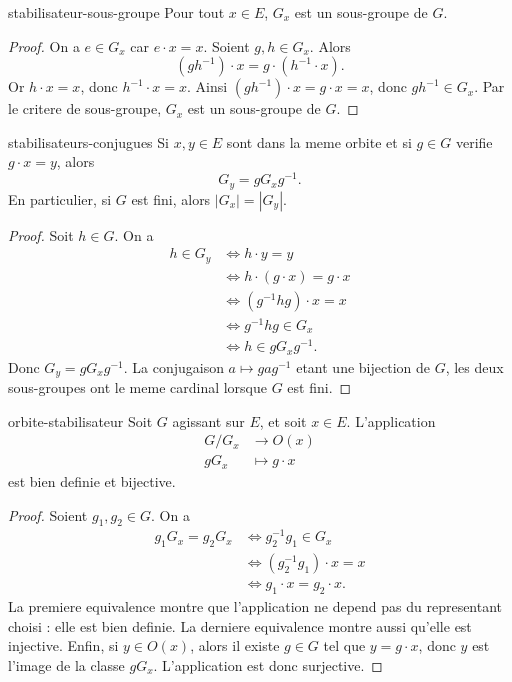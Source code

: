 \begin{proposition}{}{stabilisateur-sous-groupe}
    Pour tout $x\in E$, $G_x$ est un sous-groupe de $G$.
\end{proposition}

\begin{proof}
    On a $e\in G_x$ car $e\cdot x=x$. Soient $g,h\in G_x$. Alors
    \[
        (gh^{-1})\cdot x
        = g\cdot(h^{-1}\cdot x).
    \]
    Or $h\cdot x=x$, donc $h^{-1}\cdot x=x$. Ainsi
    $(gh^{-1})\cdot x=g\cdot x=x$, donc $gh^{-1}\in G_x$.
    Par le critere de sous-groupe, $G_x$ est un sous-groupe de $G$.
\end{proof}

\begin{proposition}{}{stabilisateurs-conjugues}
    Si $x,y\in E$ sont dans la meme orbite et si $g\in G$ verifie
    $g\cdot x=y$, alors
    \[
        G_y=gG_xg^{-1}.
    \]
    En particulier, si $G$ est fini, alors $|G_x|=|G_y|$.
\end{proposition}

\begin{proof}
    Soit $h\in G$. On a
    \[
    \begin{aligned}
        h\in G_y
        &\iff h\cdot y=y \\
        &\iff h\cdot(g\cdot x)=g\cdot x \\
        &\iff (g^{-1}hg)\cdot x=x \\
        &\iff g^{-1}hg\in G_x \\
        &\iff h\in gG_xg^{-1}.
    \end{aligned}
    \]
    Donc $G_y=gG_xg^{-1}$. La conjugaison
    $a\mapsto gag^{-1}$ etant une bijection de $G$, les deux sous-groupes ont
    le meme cardinal lorsque $G$ est fini.
\end{proof}

\begin{theoreme}{}{orbite-stabilisateur}
    Soit $G$ agissant sur $E$, et soit $x \in E$. L'application
    \[
    \begin{aligned}
        G/G_x &\longrightarrow O(x) \\
        gG_x &\longmapsto g\cdot x
    \end{aligned}
    \]
    est bien definie et bijective.
\end{theoreme}

\begin{proof}
    Soient $g_1,g_2\in G$. On a
    \[
    \begin{aligned}
        g_1G_x=g_2G_x
        &\iff g_2^{-1}g_1\in G_x \\
        &\iff (g_2^{-1}g_1)\cdot x=x \\
        &\iff g_1\cdot x=g_2\cdot x.
    \end{aligned}
    \]
    La premiere equivalence montre que l'application ne depend pas du
    representant choisi : elle est bien definie. La derniere equivalence montre
    aussi qu'elle est injective. Enfin, si $y\in O(x)$, alors il existe
    $g\in G$ tel que $y=g\cdot x$, donc $y$ est l'image de la classe $gG_x$.
    L'application est donc surjective.
\end{proof}


